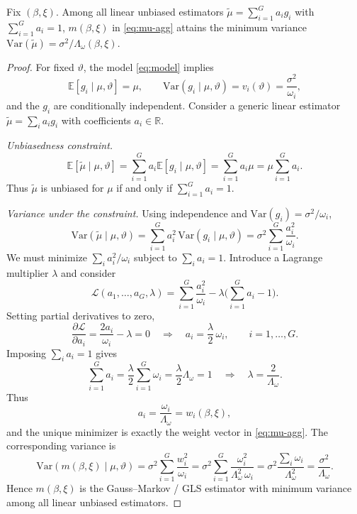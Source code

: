 \begin{proposition}
\label{prop:gls}
Fix \((\beta,\xi)\).
Among all linear unbiased estimators \(\tilde\mu=\sum_{i=1}^G a_i g_i\) with \(\sum_{i=1}^G a_i=1\),
\(m(\beta,\xi)\) in \eqref{eq:mu-agg} attains the minimum variance
\(\mathrm{Var}(\tilde\mu)=\sigma^2/\Lambda_\omega(\beta,\xi)\).
\end{proposition}
\begin{proof}
For fixed \(\vartheta\), the model \eqref{eq:model} implies
\[
\mathbb E[g_i\mid\mu,\vartheta]=\mu,
\qquad
\mathrm{Var}(g_i\mid\mu,\vartheta)=v_i(\vartheta)
=\frac{\sigma^2}{\omega_i},
\]
and the \(g_i\) are conditionally independent.
Consider a generic linear estimator
\(\tilde\mu=\sum_i a_i g_i\) with coefficients \(a_i\in\mathbb R\).

\emph{Unbiasedness constraint.}
\[
\mathbb E[\tilde\mu\mid\mu,\vartheta]
=\sum_{i=1}^G a_i \mathbb E[g_i\mid\mu,\vartheta]
=\sum_{i=1}^G a_i \mu
=\mu \sum_{i=1}^G a_i.
\]
Thus \(\tilde\mu\) is unbiased for \(\mu\) if and only if
\(\sum_{i=1}^G a_i=1\).

\emph{Variance under the constraint.}
Using independence and \(\mathrm{Var}(g_i)=\sigma^2/\omega_i\),
\[
\mathrm{Var}(\tilde\mu\mid\mu,\vartheta)
=\sum_{i=1}^G a_i^2\,\mathrm{Var}(g_i\mid\mu,\vartheta)
=\sigma^2 \sum_{i=1}^G \frac{a_i^2}{\omega_i}.
\]
We must minimize \(\sum_i a_i^2/\omega_i\) subject to \(\sum_i a_i=1\).
Introduce a Lagrange multiplier \(\lambda\) and consider
\[
\mathcal L(a_1,\dots,a_G,\lambda)
=\sum_{i=1}^G \frac{a_i^2}{\omega_i}
-\lambda\Bigg(\sum_{i=1}^G a_i -1\Bigg).
\]
Setting partial derivatives to zero,
\[
\frac{\partial \mathcal L}{\partial a_i}
=\frac{2a_i}{\omega_i}-\lambda
=0
\quad\Rightarrow\quad
a_i=\frac{\lambda}{2}\,\omega_i,\qquad i=1,\dots,G.
\]
Imposing \(\sum_i a_i=1\) gives
\[
\sum_{i=1}^G a_i
=\frac{\lambda}{2}\sum_{i=1}^G \omega_i
=\frac{\lambda}{2}\Lambda_\omega
=1
\quad\Rightarrow\quad
\lambda=\frac{2}{\Lambda_\omega}.
\]
Thus
\[
a_i
=\frac{\omega_i}{\Lambda_\omega}
=w_i(\beta,\xi),
\]
and the unique minimizer is exactly the weight vector in \eqref{eq:mu-agg}.
The corresponding variance is
\[
\mathrm{Var}(m(\beta,\xi)\mid\mu,\vartheta)
=\sigma^2 \sum_{i=1}^G \frac{w_i^2}{\omega_i}
=\sigma^2 \sum_{i=1}^G \frac{\omega_i^2}{\Lambda_\omega^2\,\omega_i}
=\sigma^2 \frac{\sum_i \omega_i}{\Lambda_\omega^2}
=\frac{\sigma^2}{\Lambda_\omega}.
\]
Hence \(m(\beta,\xi)\) is the Gauss–Markov / GLS estimator with minimum variance among all linear unbiased estimators.
\end{proof}

